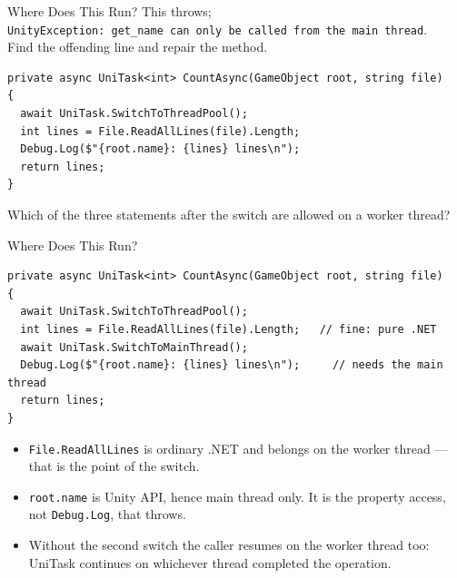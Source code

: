 \begin{exerciseframe}{Where Does This Run?}
  This throws;\\
  \texttt{UnityException: get\_name can only be called from the main thread}.\\
  Find the offending line and repair the method.
  \vspace{1ex}

  \begin{lstlisting}[basicstyle=\scriptsize\ttfamily]
private async UniTask<int> CountAsync(GameObject root, string file)
{
  await UniTask.SwitchToThreadPool();
  int lines = File.ReadAllLines(file).Length;
  Debug.Log($"{root.name}: {lines} lines\n");
  return lines;
}
  \end{lstlisting}
  \vspace{1ex}

  Which of the three statements after the switch are allowed on a worker
  thread?
\end{exerciseframe}

\begin{solutionframe}{Where Does This Run?}
  \begin{lstlisting}[basicstyle=\scriptsize\ttfamily]
private async UniTask<int> CountAsync(GameObject root, string file)
{
  await UniTask.SwitchToThreadPool();
  int lines = File.ReadAllLines(file).Length;   // fine: pure .NET
  await UniTask.SwitchToMainThread();
  Debug.Log($"{root.name}: {lines} lines\n");     // needs the main thread
  return lines;
}
  \end{lstlisting}
  \vspace{1ex}

  \begin{itemize}
    \item \texttt{File.ReadAllLines} is ordinary .NET and belongs on the
      worker thread --- that is the point of the switch.
    \item \texttt{root.name} is Unity API, hence main thread only. It is the
      property access, not \texttt{Debug.Log}, that throws.
    \item Without the second switch the caller resumes on the worker thread
      too: UniTask continues on whichever thread completed the operation.
  \end{itemize}
  \vspace{1ex}

\end{solutionframe}

